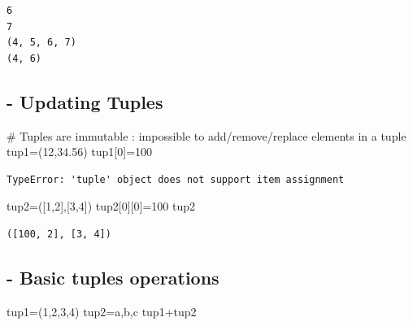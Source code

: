 \documentclass[
  a4paper,
  DIV=11,
  numbers=noendperiod]{scrreprt}
\newenvironment{Shaded}{\begin{snugshade}}{\end{snugshade}}
\newcommand{\CommentTok}[1]{\textcolor[rgb]{0.37,0.37,0.37}{#1}}
\newcommand{\DecValTok}[1]{\textcolor[rgb]{0.68,0.00,0.00}{#1}}
\newcommand{\FloatTok}[1]{\textcolor[rgb]{0.68,0.00,0.00}{#1}}
\newcommand{\NormalTok}[1]{\textcolor[rgb]{0.00,0.23,0.31}{#1}}
\newcommand{\OperatorTok}[1]{\textcolor[rgb]{0.37,0.37,0.37}{#1}}
\newcommand{\StringTok}[1]{\textcolor[rgb]{0.13,0.47,0.30}{#1}}
\begin{document}
\begin{verbatim}
6
7
(4, 5, 6, 7)
(4, 6)
\end{verbatim}

\subsection{- Updating Tuples}\label{updating-tuples}

\begin{Shaded}
\begin{Highlighting}[]
\CommentTok{\# Tuples are immutable : impossible to add/remove/replace elements in a tuple}
\NormalTok{tup1}\OperatorTok{=}\NormalTok{(}\DecValTok{12}\NormalTok{,}\FloatTok{34.56}\NormalTok{)}
\NormalTok{tup1[}\DecValTok{0}\NormalTok{]}\OperatorTok{=}\DecValTok{100}
\end{Highlighting}
\end{Shaded}

\begin{verbatim}
TypeError: 'tuple' object does not support item assignment
\end{verbatim}

\begin{Shaded}
\begin{Highlighting}[]
\NormalTok{tup2}\OperatorTok{=}\NormalTok{([}\DecValTok{1}\NormalTok{,}\DecValTok{2}\NormalTok{],[}\DecValTok{3}\NormalTok{,}\DecValTok{4}\NormalTok{])}
\NormalTok{tup2[}\DecValTok{0}\NormalTok{][}\DecValTok{0}\NormalTok{]}\OperatorTok{=}\DecValTok{100}
\NormalTok{tup2}
\end{Highlighting}
\end{Shaded}

\begin{verbatim}
([100, 2], [3, 4])
\end{verbatim}

\subsection{- Basic tuples operations}\label{basic-tuples-operations}

\begin{Shaded}
\begin{Highlighting}[]
\NormalTok{tup1}\OperatorTok{=}\NormalTok{(}\DecValTok{1}\NormalTok{,}\DecValTok{2}\NormalTok{,}\DecValTok{3}\NormalTok{,}\DecValTok{4}\NormalTok{)}
\NormalTok{tup2}\OperatorTok{=}\StringTok{\textquotesingle{}a\textquotesingle{}}\NormalTok{,}\StringTok{\textquotesingle{}b\textquotesingle{}}\NormalTok{,}\StringTok{\textquotesingle{}c\textquotesingle{}}
\NormalTok{tup1}\OperatorTok{+}\NormalTok{tup2}
\end{Highlighting}
\end{Shaded}
\end{document}
